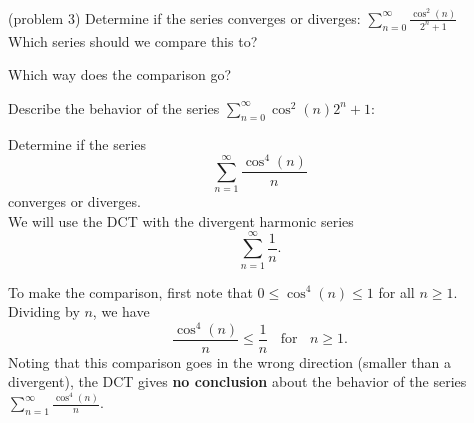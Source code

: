 \documentclass[handout]{ximera}
\begin{document}
\begin{problem}(problem 3)
Determine if the series converges or diverges: $\sum_{n=0}^\infty \frac{\cos^2(n)}{2^n + 1}$\\
Which series should we compare this to?

\begin{multipleChoice}
\end{multipleChoice}

Which way does the comparison go?
\begin{multipleChoice}
\end{multipleChoice}

Describe the behavior of the series $\sum_{n=0}^\infty {\cos^2(n)}{2^n + 1}:$
\begin{multipleChoice}
\end{multipleChoice}

\end{problem}




\begin{example}[example 4] %
Determine if the series 
\[
\sum_{n=1}^\infty \frac{\cos^4(n)}{n}
\]
 converges or diverges.\\
We will use the DCT with the divergent harmonic series 
\[
\sum_{n=1}^\infty \frac{1}{n}.
\]
 
To make the comparison, first note that $0 \leq \cos^4(n) \leq 1$ for all $n \geq 1$. Dividing by $n$,
we have 
\[
\frac{\cos^4(n)}{n} \leq \frac{1}{n} \; \; \text{ for } \; \; n \geq 1.
\]
Noting that this comparison goes in the wrong direction (smaller than a divergent), the DCT gives \textbf{no conclusion}
about the behavior of the series $\sum_{n=1}^\infty \frac{\cos^4(n)}{n}$.
\end{example}
\end{document}
